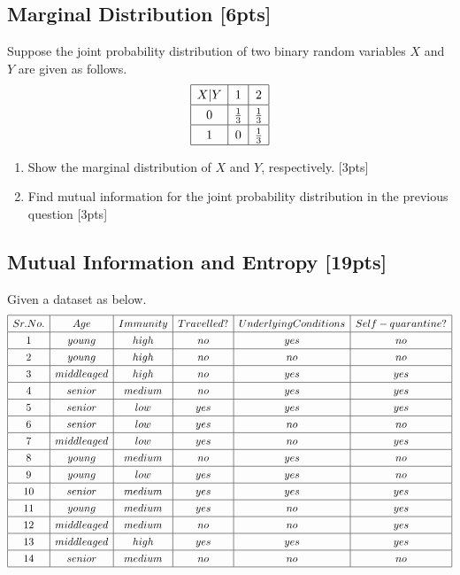 \documentclass{article}
\begin{document}
\subsection{Marginal Distribution [6pts]}

Suppose the joint probability distribution of two binary random variables $X$ and $Y$ are given as follows.
$$
\renewcommand*{\arraystretch}{1.3}
\begin{array}{|c|c|c|}\hline X | Y & {1} & {2} \\ \hline 0 & {\frac{1}{3}} & {\frac{1}{3}} \\ \hline 1 & {0} & {\frac{1}{3}} \\ \hline\end{array}
$$

\begin{enumerate}[label=(\alph*)]

\item Show the marginal distribution of $X$ and $Y$, respectively. [3pts]


\item Find mutual information for the joint probability distribution in the previous question [3pts]

     
\end{enumerate}
\subsection{Mutual Information and Entropy [19pts]}

Given a dataset as below.
$$
\begin{array}{|c|c|c|c|c|c|}\hline Sr.No. & Age & Immunity & Travelled? & Underlying Conditions & Self-quarantine? \\ \hline 1 & young & high & no & yes & no \\ \hline 2 & young & high & no & no & no \\ \hline 3 & middle aged & high & no & yes & yes \\ \hline 4 & senior & medium & no & yes & yes \\ \hline 5 & senior & low & yes & yes & yes \\ \hline 6 & senior & low & yes & no & no \\ \hline 7 & middle aged & low & yes & no & yes\\ \hline 8 & young & medium & no & yes & no\\ \hline 9 & young & low & yes & yes & no\\ \hline 10 & senior & medium & yes & yes & yes\\ \hline 11 & young & medium & yes & no & yes \\ \hline 12 & middle aged & medium & no & no & yes \\ \hline 13 & middle aged & high & yes & yes & yes \\ \hline 14 & senior & medium & no & no & no \\\hline\end{array}
$$
\end{document}
